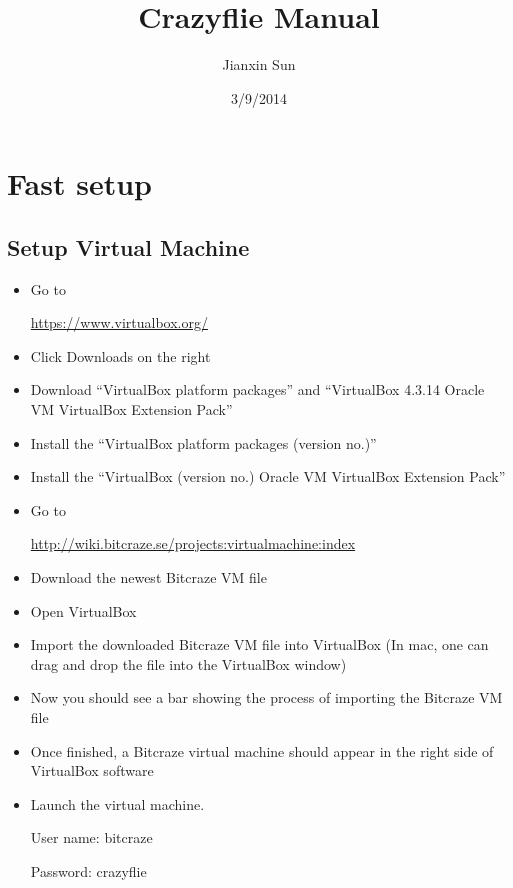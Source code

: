 \documentclass[11pt]{article}
\begin{document}
\title{Crazyflie Manual}
\author{Jianxin Sun}
\date{3/9/2014}
\maketitle

\section{Fast setup}
\subsection{Setup Virtual Machine}
\begin{itemize}
\item Go to 

\url{https://www.virtualbox.org/}
\item Click Downloads on the right
\item Download ``VirtualBox platform packages'' and ``VirtualBox 4.3.14 Oracle VM VirtualBox Extension Pack''
\item Install the ``VirtualBox platform packages (version no.)''
\item Install the ``VirtualBox (version no.) Oracle VM VirtualBox Extension Pack''
\item Go to 

\url{http://wiki.bitcraze.se/projects:virtualmachine:index}
\item Download the newest Bitcraze VM file
\item Open VirtualBox
\item Import the downloaded Bitcraze VM file into VirtualBox (In mac, one can drag and drop the file into the VirtualBox window)
\item Now you should see a bar showing the process of importing the Bitcraze VM file
\item Once finished, a Bitcraze virtual machine should appear in the right side of VirtualBox software
\item Launch the virtual machine. 

User name: bitcraze

Password: crazyflie
\end{itemize}
\end{document}
